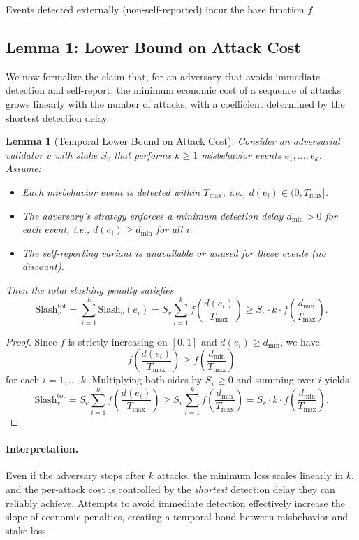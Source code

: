 \documentclass[11pt]{article}
\theoremstyle{plain}
\newtheorem{lemma}{Lemma}
\theoremstyle{definition}
\begin{document}
Events detected externally (non-self-reported) incur the base function \(f\).

\subsection{Lemma 1: Lower Bound on Attack Cost}

We now formalize the claim that, for an adversary that avoids immediate detection and self-report, the minimum economic cost of a sequence of attacks grows linearly with the number of attacks, with a coefficient determined by the shortest detection delay.

\begin{lemma}[Temporal Lower Bound on Attack Cost]
\label{lem:attack-cost}
Consider an adversarial validator \(v\) with stake \(S_v\) that performs \(k \ge 1\) misbehavior events \(e_1,\dots,e_k\). Assume:
\begin{itemize}[leftmargin=*]
  \item Each misbehavior event is detected within \(T_{\max}\), i.e., \(d(e_i) \in (0,T_{\max}]\).
  \item The adversary's strategy enforces a minimum detection delay \(d_{\min} > 0\) for each event, i.e., \(d(e_i) \ge d_{\min}\) for all \(i\).
  \item The self-reporting variant is unavailable or unused for these events (no discount).
\end{itemize}
Then the total slashing penalty satisfies
\[
\mathrm{Slash}^{\mathrm{tot}}_v
= \sum_{i=1}^k \mathrm{Slash}_v(e_i)
= S_v \sum_{i=1}^k f\!\left(\frac{d(e_i)}{T_{\max}}\right)
\ge S_v \cdot k \cdot f\!\left(\frac{d_{\min}}{T_{\max}}\right).
\]
\end{lemma}

\begin{proof}
Since \(f\) is strictly increasing on \([0,1]\) and \(d(e_i) \ge d_{\min}\), we have
\[
f\!\left(\frac{d(e_i)}{T_{\max}}\right)
\ge f\!\left(\frac{d_{\min}}{T_{\max}}\right)
\]
for each \(i=1,\dots,k\). Multiplying both sides by \(S_v \ge 0\) and summing over \(i\) yields
\[
\mathrm{Slash}^{\mathrm{tot}}_v
= S_v \sum_{i=1}^k f\!\left(\frac{d(e_i)}{T_{\max}}\right)
\ge S_v \sum_{i=1}^k f\!\left(\frac{d_{\min}}{T_{\max}}\right)
= S_v \cdot k \cdot f\!\left(\frac{d_{\min}}{T_{\max}}\right).
\]
\end{proof}

\paragraph{Interpretation.}
Even if the adversary stops after \(k\) attacks, the minimum loss scales linearly in \(k\), and the per-attack cost is controlled by the \emph{shortest} detection delay they can reliably achieve. Attempts to avoid immediate detection effectively increase the slope of economic penalties, creating a temporal bond between misbehavior and stake loss.
\end{document}
